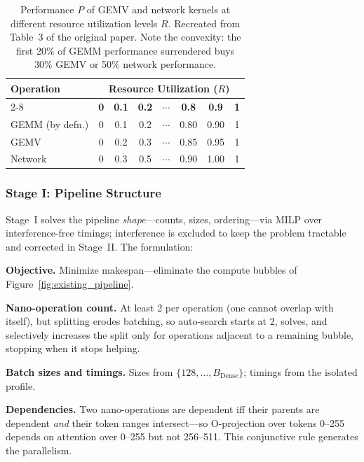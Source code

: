 \documentclass[manuscript,review]{acmart}
\newcommand{\Bdense}{B_{\mathrm{Dense}}}
\begin{document}
\begin{table}[t]
\centering
\caption{Performance $P$ of GEMV and network kernels at different resource
utilization levels $R$. Recreated from Table~3 of the original paper. Note the
convexity: the first 20\% of GEMM performance surrendered buys 30\% GEMV or 50\%
network performance.}
\label{tab:interference}
\begin{tabular}{lccccccc}
\toprule
\multirow{2}{*}{\textbf{Operation}} &
\multicolumn{7}{c}{\textbf{Resource Utilization} ($R$)} \\
\cmidrule(lr){2-8}
 & \textbf{0} & \textbf{0.1} & \textbf{0.2} & $\cdots$ &
   \textbf{0.8} & \textbf{0.9} & \textbf{1} \\
\midrule
GEMM (by defn.) & 0 & 0.1 & 0.2 & $\cdots$ & 0.80 & 0.90 & 1 \\
GEMV            & 0 & 0.2 & 0.3 & $\cdots$ & 0.85 & 0.95 & 1 \\
Network         & 0 & 0.3 & 0.5 & $\cdots$ & 0.90 & 1.00 & 1 \\
\bottomrule
\end{tabular}
\end{table}

\subsubsection{Stage I: Pipeline Structure}

Stage~I solves the pipeline \emph{shape}---counts, sizes, ordering---via MILP over interference-free timings; 
interference is excluded to keep the problem tractable and corrected in Stage~II. The formulation:

\textbf{Objective.} Minimize makespan---eliminate the compute bubbles of
Figure~\ref{fig:existing_pipeline}.

\textbf{Nano-operation count.} At least 2 per operation (one cannot overlap with itself), but splitting erodes 
batching, so auto-search starts at 2, solves, and selectively increases the split only for operations adjacent 
to a remaining bubble, stopping when it stops helping.

\textbf{Batch sizes and timings.} Sizes from $\{128, \ldots, \Bdense\}$; timings from the isolated profile.

\textbf{Dependencies.} Two nano-operations are dependent iff their parents are dependent \emph{and} their token 
ranges intersect---so O-projection over tokens 0--255 depends on attention over 0--255 but not 256--511. This 
conjunctive rule generates the parallelism.
\end{document}

